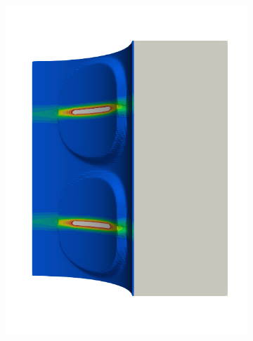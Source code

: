 \begin{frame}
\begin{columns}[T]
\begin{column}{0.6\textwidth}
\begin{figure}
{\begin{subfigure}{0.19\textwidth}
            \includegraphics[width=\textwidth]{Chapter345/figures/seed_d_6}
          \end{subfigure}
          \hspace{0.06\textwidth}
          \begin{subfigure}{0.19\textwidth}
            \centering

\end{subfigure}}
\end{figure}
\end{column}
\end{columns}
\end{frame}
